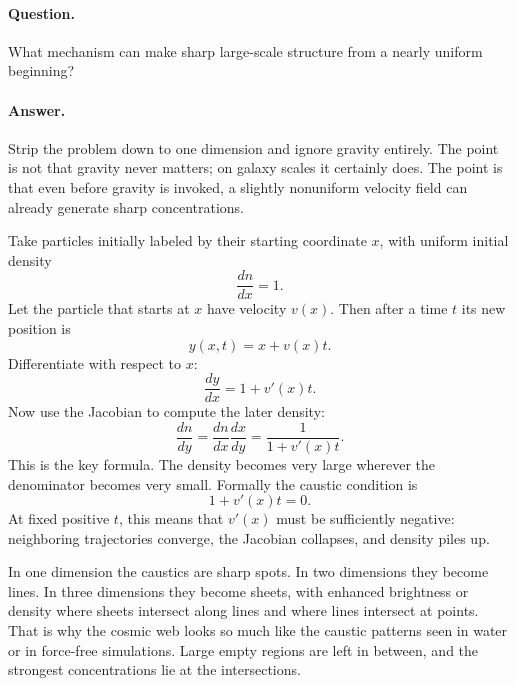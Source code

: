 \paragraph{Question.} What mechanism can make sharp large-scale structure from a nearly uniform beginning?

\paragraph{Answer.} Strip the problem down to one dimension and ignore gravity entirely. The point is not that gravity never matters; on galaxy scales it certainly does. The point is that even before gravity is invoked, a slightly nonuniform velocity field can already generate sharp concentrations.

Take particles initially labeled by their starting coordinate \(x\), with uniform initial density
\begin{equation}
\frac{dn}{dx}=1.
\end{equation}
Let the particle that starts at \(x\) have velocity \(v(x)\). Then after a time \(t\) its new position is
\begin{equation}
y(x,t)=x+v(x)t.
\end{equation}
Differentiate with respect to \(x\):
\begin{equation}
\frac{dy}{dx}=1+v'(x)t.
\end{equation}
Now use the Jacobian to compute the later density:
\begin{equation}
\frac{dn}{dy}
=
\frac{dn}{dx}\frac{dx}{dy}
=
\frac{1}{1+v'(x)t}.
\end{equation}
This is the key formula. The density becomes very large wherever the denominator becomes very small. Formally the caustic condition is
\begin{equation}
1+v'(x)t=0.
\end{equation}
At fixed positive \(t\), this means that \(v'(x)\) must be sufficiently negative: neighboring trajectories converge, the Jacobian collapses, and density piles up.

In one dimension the caustics are sharp spots. In two dimensions they become lines. In three dimensions they become sheets, with enhanced brightness or density where sheets intersect along lines and where lines intersect at points. That is why the cosmic web looks so much like the caustic patterns seen in water or in force-free simulations. Large empty regions are left in between, and the strongest concentrations lie at the intersections.

